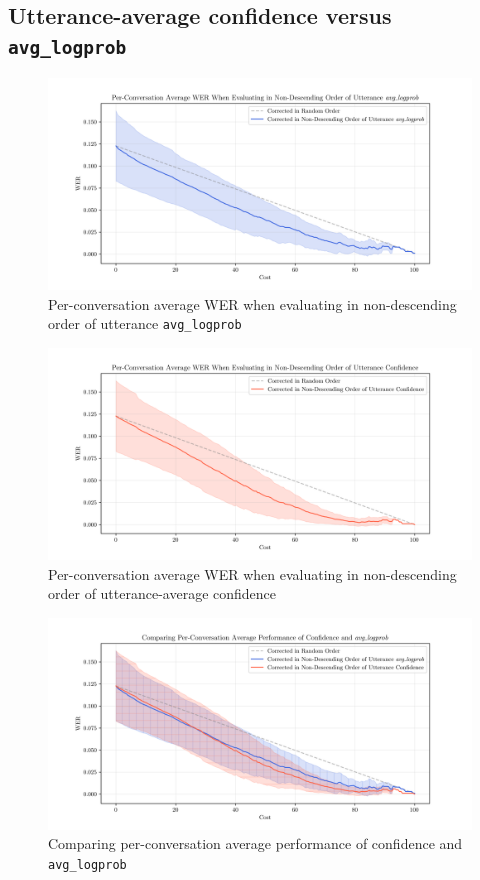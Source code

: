 \clearpage
\subsection{Utterance-average confidence versus \texttt{avg\_logprob}}

\begin{figure}[h!]
 \caption{Per-conversation average WER when evaluating in non-descending order of utterance \texttt{avg\_logprob}}
 \label{fig:average-avg-logprob}
 \centering
 \includegraphics[width=\textwidth]{figures/average-avg-logprob.png}
\end{figure}
\begin{figure}[h!]
 \caption{Per-conversation average WER when evaluating in non-descending order of utterance-average confidence}
 \label{fig:average-uttconf}
 \includegraphics[width=\textwidth]{figures/average-uttconf.png}
 \centering
\end{figure}
\begin{figure}[p]
 \caption{Comparing per-conversation average performance of confidence and \texttt{avg\_logprob}}
 \label{fig:compare-avg-uttconf-vs-lprob}
 \includegraphics[width=\textwidth]{figures/compare-avg-uttconf-vs-lprob.png}
 \centering
\end{figure}
